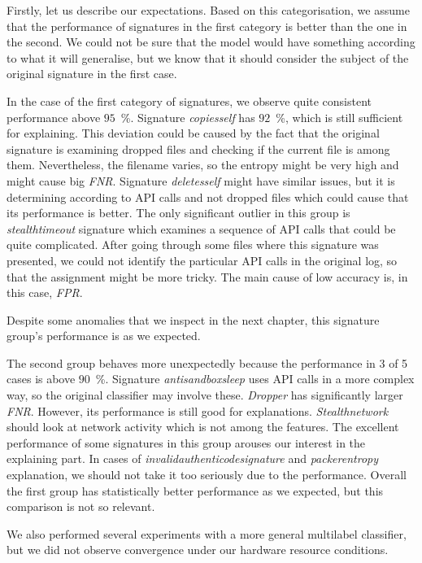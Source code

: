 Firstly, let us describe our expectations. Based on this categorisation, we assume that the performance of signatures in the first category is better than the one in the second. We could not be sure that the model would have something according to what it will generalise, but we know that it should consider the subject of the original signature in the first case.

In the case of the first category of signatures, we observe quite consistent performance above $95$~\%. Signature \emph{copiesself} has $92$~\%, which is still sufficient for explaining. This deviation could be caused by the fact that the original signature is examining dropped files and checking if the current file is among them. Nevertheless, the filename varies, so the entropy might be very high and might cause big \emph{FNR}. Signature \emph{deletesself} might have similar issues, but it is determining according to API calls and not dropped files which could cause that its performance is better. The only significant outlier in this group is \emph{stealthtimeout} signature which examines a sequence of API calls that could be quite complicated. After going through some files where this signature was presented, we could not identify the particular API calls in the original log, so that the assignment might be more tricky. The main cause of low accuracy is, in this case, \emph{FPR}.

Despite some anomalies that we inspect in the next chapter, this signature group's performance is as we expected. 


The second group behaves more unexpectedly because the performance in 3 of 5 cases is above $90$~\%. Signature \emph{antisandboxsleep} uses API calls in a more complex way, so the original classifier may involve these. \emph{Dropper} has significantly larger \emph{FNR}. However, its performance is still good for explanations. \emph{Stealthnetwork} should look at network activity which is not among the features. The excellent performance of some signatures in this group arouses our interest in the explaining part. In cases of \emph{invalidauthenticodesignature} and \emph{packerentropy} explanation, we should not take it too seriously due to the performance. Overall the first group has statistically better performance as we expected, but this comparison is not so relevant.

We also performed several experiments with a more general multilabel classifier, but we did not observe convergence under our hardware resource conditions.

